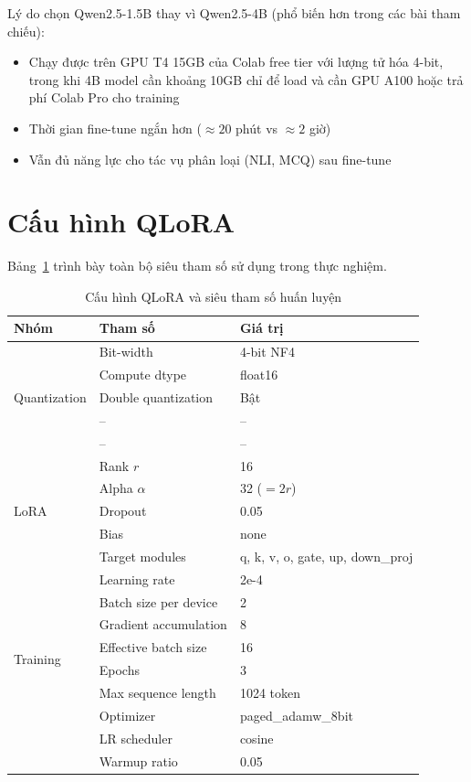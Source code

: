 \documentclass[fontsize=13pt,a4paper,oneside,DIV=calc,chapterprefix=true]{scrbook}
\begin{document}
Lý do chọn Qwen2.5-1.5B thay vì Qwen2.5-4B (phổ biến hơn trong các bài tham chiếu):
\begin{itemize}
  \item Chạy được trên GPU T4 15GB của Colab free tier với lượng tử hóa 4-bit, trong khi 4B
    model cần khoảng 10GB chỉ để load và cần GPU A100 hoặc trả phí Colab Pro cho training
  \item Thời gian fine-tune ngắn hơn ($\approx 20$ phút vs $\approx 2$ giờ)
  \item Vẫn đủ năng lực cho tác vụ phân loại (NLI, MCQ) sau fine-tune
\end{itemize}

\section{Cấu hình QLoRA}

Bảng~\ref{tab:qlora_config} trình bày toàn bộ siêu tham số sử dụng trong thực nghiệm.

\begin{table}[H]
\centering
\caption{Cấu hình QLoRA và siêu tham số huấn luyện}
\label{tab:qlora_config}
\begin{tabular}{lll}
\toprule
\textbf{Nhóm} & \textbf{Tham số} & \textbf{Giá trị} \\
\midrule
\multirow{5}{*}{Quantization} & Bit-width & 4-bit NF4 \\
 & Compute dtype & float16 \\
 & Double quantization & Bật \\
 & -- & -- \\
 & -- & -- \\
\midrule
\multirow{5}{*}{LoRA} & Rank $r$ & 16 \\
 & Alpha $\alpha$ & 32 ($= 2r$) \\
 & Dropout & 0.05 \\
 & Bias & none \\
 & Target modules & q, k, v, o, gate, up, down\_proj \\
\midrule
\multirow{8}{*}{Training} & Learning rate & 2e-4 \\
 & Batch size per device & 2 \\
 & Gradient accumulation & 8 \\
 & Effective batch size & 16 \\
 & Epochs & 3 \\
 & Max sequence length & 1024 token \\
 & Optimizer & paged\_adamw\_8bit \\
 & LR scheduler & cosine \\
 & Warmup ratio & 0.05 \\
\bottomrule
\end{tabular}
\end{table}
\end{document}
